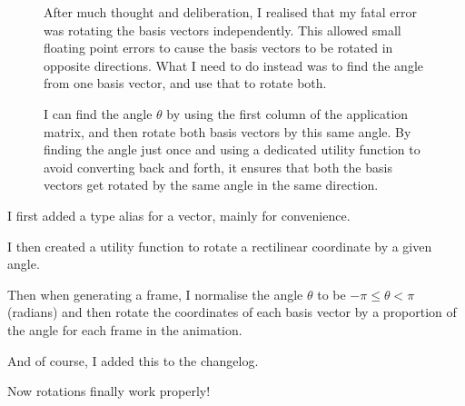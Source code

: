 \documentclass[../development.tex]{subfiles}
\begin{document}
\begin{figure}[H]
	\begin{minipage}{0.45\linewidth}
	\end{minipage}\hfill
	\begin{minipage}{0.5\linewidth}\setspacing
		After much thought and deliberation, I realised that my fatal error was rotating the basis vectors independently. This allowed small floating point errors to cause the basis vectors to be rotated in opposite directions. What I need to do instead was to find the angle from one basis vector, and use that to rotate both.

		I can find the angle $\theta$ by using the first column of the application matrix, and then rotate both basis vectors by this same angle. By finding the angle just once and using a dedicated  utility function to avoid converting back and forth, it ensures that both the basis vectors get rotated by the same angle in the same direction.
	\end{minipage}
	\vspace{-1em}
\end{figure}

I first added a type alias for a vector, mainly for convenience.


I then created a utility function to rotate a rectilinear coordinate by a given angle.


Then when generating a frame, I normalise the angle $\theta$ to be $-\pi \leq \theta < \pi$ (radians) and then rotate the coordinates of each basis vector by a proportion of the angle for each frame in the animation.


And of course, I added this to the changelog.


Now rotations finally work properly!
\end{document}
